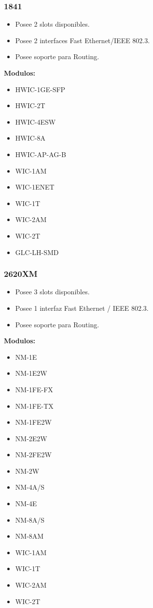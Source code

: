 \documentclass{article}
\begin{document}
\subsubsection{1841}
\begin{itemize}
    \item Posee 2 slots disponibles.
    \item Posee 2 interfaces Fast Ethernet/IEEE 802.3.
    \item Posee soporte para Routing.
\end{itemize}
\textbf{Modulos:}
\begin{itemize}
    \item HWIC-1GE-SFP
    \item HWIC-2T
    \item HWIC-4ESW
    \item HWIC-8A
    \item HWIC-AP-AG-B
    \item WIC-1AM
    \item WIC-1ENET
    \item WIC-1T
    \item WIC-2AM
    \item WIC-2T
    \item GLC-LH-SMD
\end{itemize}

\subsubsection{2620XM}
\begin{itemize}
    \item Posee 3 slots disponibles.
    \item Posee 1 interfaz Fast Ethernet / IEEE 802.3.
    \item Posee soporte para Routing.
\end{itemize}
\textbf{Modulos:}
\begin{itemize}
    \item NM-1E
    \item NM-1E2W
    \item NM-1FE-FX
    \item NM-1FE-TX
    \item NM-1FE2W
    \item NM-2E2W
    \item NM-2FE2W
    \item NM-2W
    \item NM-4A/S
    \item NM-4E
    \item NM-8A/S
    \item NM-8AM
    \item WIC-1AM
    \item WIC-1T
    \item WIC-2AM
    \item WIC-2T
\end{itemize}
\end{document}
